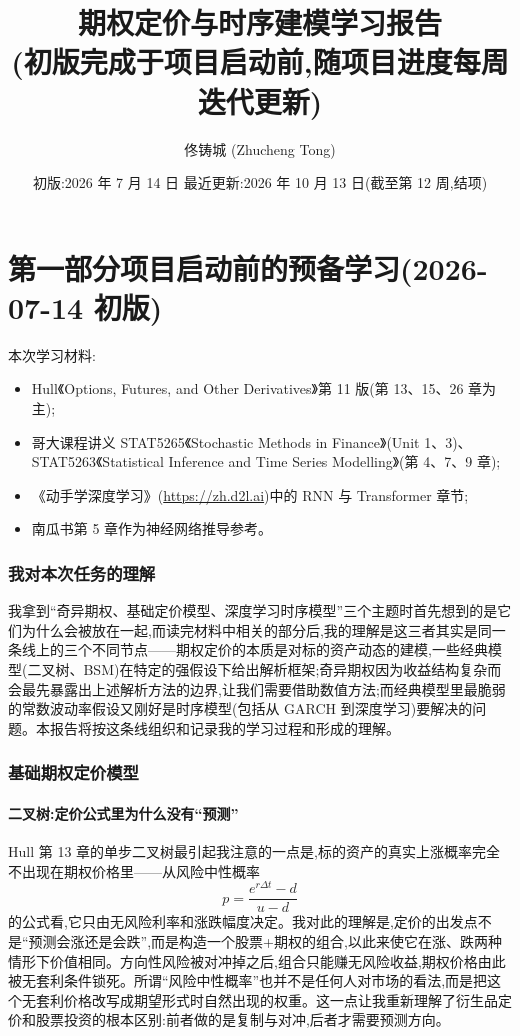 \documentclass[11pt]{ctexart}
\title{\textbf{期权定价与时序建模学习报告}\\
\large (初版完成于项目启动前,随项目进度每周迭代更新)}
\author{佟铸城 (Zhucheng Tong)}
\date{初版:2026 年 7 月 14 日 \quad 最近更新:2026 年 10 月 13 日(截至第 12 周,结项)}
\begin{document}
\maketitle
\tableofcontents
\clearpage
{}

\part*{第一部分\quad 项目启动前的预备学习(2026-07-14 初版)}

\noindent 本次学习材料:
\begin{itemize}
  \item Hull《Options, Futures, and Other Derivatives》第 11 版(第 13、15、26 章为主);
  \item 哥大课程讲义 STAT5265《Stochastic Methods in Finance》(Unit 1、3)、STAT5263《Statistical Inference and Time Series Modelling》(第 4、7、9 章);
  \item 《动手学深度学习》(\url{https://zh.d2l.ai})中的 RNN 与 Transformer 章节;
  \item 南瓜书第 5 章作为神经网络推导参考。
\end{itemize}

\section{我对本次任务的理解}
我拿到``奇异期权、基础定价模型、深度学习时序模型''三个主题时首先想到的是它们为什么会被放在一起,而读完材料中相关的部分后,我的理解是这三者其实是同一条线上的三个不同节点——期权定价的本质是对标的资产动态的建模,一些经典模型(二叉树、BSM)在特定的强假设下给出解析框架;奇异期权因为收益结构复杂而会最先暴露出上述解析方法的边界,让我们需要借助数值方法;而经典模型里最脆弱的常数波动率假设又刚好是时序模型(包括从 GARCH 到深度学习)要解决的问题。本报告将按这条线组织和记录我的学习过程和形成的理解。

\section{基础期权定价模型}

\subsection{二叉树:定价公式里为什么没有``预测''}
Hull 第 13 章的单步二叉树最引起我注意的一点是,标的资产的真实上涨概率完全不出现在期权价格里——从风险中性概率
\[ p = \frac{e^{r\Delta t} - d}{u - d} \]
的公式看,它只由无风险利率和涨跌幅度决定。我对此的理解是,定价的出发点不是``预测会涨还是会跌'',而是构造一个股票+期权的组合,以此来使它在涨、跌两种情形下价值相同。方向性风险被对冲掉之后,组合只能赚无风险收益,期权价格由此被无套利条件锁死。所谓``风险中性概率''也并不是任何人对市场的看法,而是把这个无套利价格改写成期望形式时自然出现的权重。这一点让我重新理解了衍生品定价和股票投资的根本区别:前者做的是复制与对冲,后者才需要预测方向。
\end{document}
